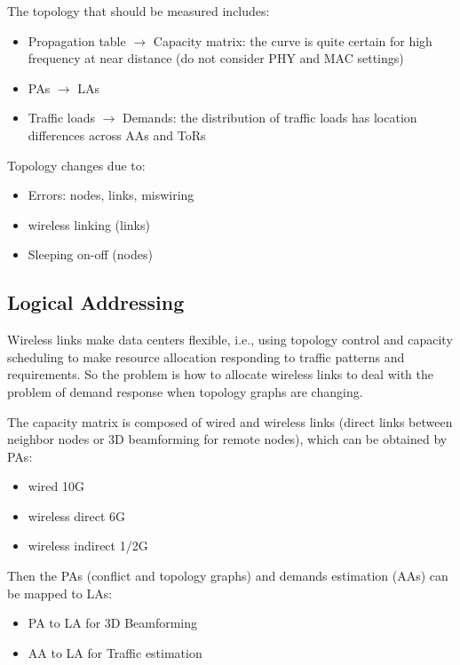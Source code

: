 \documentclass[journal,onecolumn,11pt]{IEEEtran}
\begin{document}
The topology that should be measured includes:
\begin{itemize}
  \item Propagation table $\rightarrow$ Capacity matrix: the curve is quite certain for high frequency at near distance (do not consider PHY and MAC settings) \cite{Zhou:2012:MMC:2342356.2342440,Halperin:2011:ADC:2018436.2018442}
  \item PAs $\rightarrow$ LAs
  \item Traffic loads $\rightarrow$ Demands: the distribution of traffic loads has location differences across AAs and ToRs \cite{Halperin:2011:ADC:2018436.2018442,Greenberg:2009:VSF:1592568.1592576}
\end{itemize}

Topology changes due to:
\begin{itemize}
  \item Errors: nodes, links, miswiring
  \item wireless linking (links)
  \item Sleeping on-off (nodes)
\end{itemize}

\subsection{Logical Addressing}

Wireless links make data centers flexible, i.e., using topology control and capacity scheduling to make resource allocation responding to traffic patterns and requirements. So the problem is how to allocate wireless links to deal with the problem of demand response when topology graphs are changing.

The capacity matrix is composed of wired and wireless links (direct links between neighbor nodes or 3D beamforming for remote nodes), which can be obtained by PAs:
\begin{itemize}
  \item wired 10G
  \item wireless direct 6G
  \item wireless indirect 1/2G
\end{itemize}

Then the PAs (conflict and topology graphs) and demands estimation (AAs) can be mapped to LAs:
\begin{itemize}
  \item PA to LA for 3D Beamforming
  \item AA to LA for Traffic estimation
\end{itemize}
\end{document}
